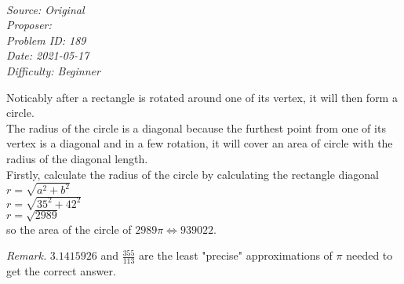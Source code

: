 \SSbreak\\
\emph{Source: Original}\\
\emph{Proposer: \Prandom}\\ %
\emph{Problem ID: 189}\\
\emph{Date: 2021-05-17}\\
\emph{Difficulty: Beginner}\\
\SSbreak

\bigskip

\begin{solution}\hfil\medskip
	
	Noticably after a rectangle is rotated around one of its vertex, it will then form a circle. \\
The radius of the circle is a diagonal because the furthest point from one of its vertex is a diagonal and in a few rotation, it will cover an area of circle with the radius of the diagonal length. \\
Firstly, calculate the radius of the circle by calculating the rectangle diagonal \\
$ r = \sqrt{a^2 + b^2} $ \\
$ r = \sqrt{35^2 + 42^2} $ \\
$ r = \sqrt{2989} $ \\
so the area of the circle of $2989\pi \iff \boxed{939022}$. \medskip

\textit{Remark.} $3.1415926$ and $\frac{355}{113}$ are the least "precise" approximations of $\pi$ needed to get the correct answer.
\end{solution}\bigskip
